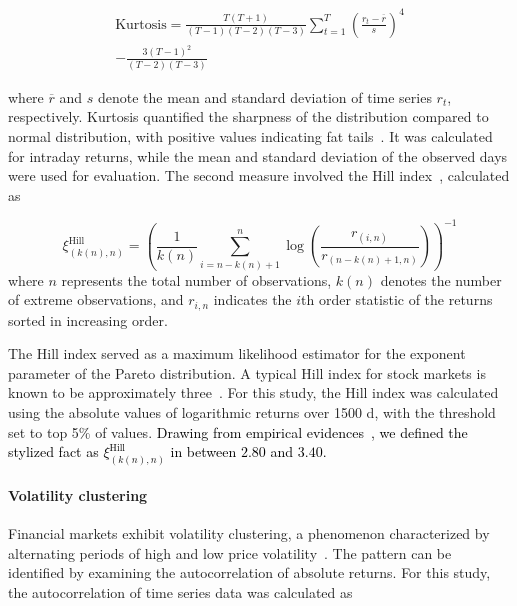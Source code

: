 \documentclass{article}
\newcommand{\hashimoto}[1]{\textcolor{black}{#1}}
\begin{document}
\begin{equation}
\begin{split}
    \text{Kurtosis} = \frac{T(T + 1)}{(T - 1)(T - 2)(T - 3)} \sum_{t=1}^{T} \left( \frac{r_t - \overline{r}}{s} \right)^4 \\ 
    - \frac{3(T - 1)^2}{(T - 2)(T - 3)}
\end{split}
\end{equation}

where $\overline{r}$ and $s$ denote the mean and standard deviation of time series $r_t$, respectively. Kurtosis quantified the sharpness of the distribution compared to normal distribution, with positive values indicating fat tails~\cite{kurtosis}. It was calculated for intraday returns, while the mean and standard deviation of the observed days were used for evaluation. The second measure involved the Hill index~\cite{hill}, calculated as

\small
\begin{equation}
    \xi^{\text{Hill}}_{(k(n), n)} = \left( \frac{1}{k(n)} \sum_{i=n-k(n)+1}^{n} \log \left( \frac{r_{(i,n)}}{r_{(n-k(n)+1,n)}} \right) \right) ^{-1}
\end{equation}
\normalsize
where $n$ represents the total number of observations, $k(n)$ denotes the number of extreme observations, and $r_{i, n}$ indicates the $i$th order statistic of the returns sorted in increasing order.

The Hill index served as a maximum likelihood estimator for the exponent parameter of the Pareto distribution. A typical Hill index for stock markets is known to be approximately three~\cite{cubic_law}. For this study, the Hill index was calculated using the absolute values of logarithmic returns over 1500 d, with the threshold set to top 5$\%$ of values. \hashimoto{Drawing from empirical evidences~\cite{empirical_power_law_return2,empirical_power_law_return3,empirical_power_law_return1}, we defined the stylized fact as $\xi^{\text{Hill}}_{(k(n), n)}$ in between $2.80$ and $3.40$.}

\paragraph{Volatility clustering}

Financial markets exhibit volatility clustering, a phenomenon characterized by alternating periods of high and low price volatility~\cite{volatility_clustering}. The pattern can be identified by examining the autocorrelation of absolute returns. For this study, the autocorrelation of time series data was calculated as
\end{document}
